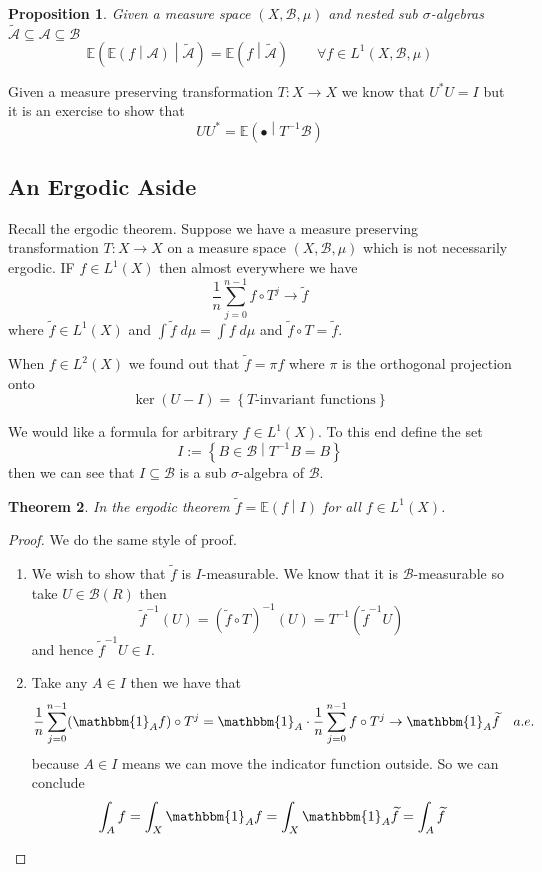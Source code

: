\documentclass[11pt]{article}
\newcommand{\defeq}{:=}
\newcommand{\indic}[1]{\mathbbm{1}_{#1}}
\newcommand{\relmiddle}[1]{\mathrel{}\middle#1\mathrel{}}
\newcommand{\rmv}{\relmiddle|}
\newcommand{\gvn}[2]{\ensuremath{\left(#1\rmv#2\right)}}
\newcommand{\expg}[2]{\ensuremath{\mathbb{E}\gvn{#1}{#2}}}
\newcommand{\dm}{\;d\mu}
\newtheorem{prop}{Proposition}[section]
\newtheorem{theorem}[prop]{Theorem}
\begin{document}
\begin{prop}
Given a measure space $(X, \mathcal{B}, \mu)$ and nested sub $\sigma$-algebras $\widetilde{\mathcal{A}}\subseteq\mathcal{A}\subseteq\mathcal{B}$
\[
	\expg{\expg{f}{\mathcal{A}}}{\widetilde{\mathcal{A}}} = \expg{f}{\widetilde{\mathcal{A}}} \quad \quad \forall f \in L^1(X, \mathcal{B}, \mu)
\]
\end{prop}

Given a measure preserving transformation $T: X \to X$ we know that $U^\ast U = I$ but it is an exercise to show that
\[
	UU^\ast = \expg{\bullet}{T^{-1}\mathcal{B}}
\]



\subsection{An Ergodic Aside}
Recall the ergodic theorem.
Suppose we have a measure preserving transformation $T:X \to X$ on a measure space $(X, \mathcal{B}, \mu)$ which is not necessarily ergodic.
IF $f\in L^1(X)$ then almost everywhere we have
\[
	\frac{1}{n}\sum_{j=0}^{n-1}f\circ T^j \to \widetilde{f}
\]
where $\widetilde{f}\in L^1(X)$ and $\int \widetilde{f}\dm = \int f \dm$ and $\widetilde{f}\circ T = \widetilde{f}$.

When $f\in L^2(X)$ we found out that $\widetilde{f}=\pi f$ where $\pi$ is the orthogonal projection onto
\[
\ker(U - I) = \left\{ T\text{-invariant functions} \right\}
\]

We would like a formula for arbitrary $f\in L^1(X)$.
To this end define the set
\[
	I \defeq \left\{ B\in \mathcal{B} \rmv T^{-1}B = B\right\}
\]
then we can see that $I\subseteq\mathcal{B}$ is a sub $\sigma$-algebra of $\mathcal{B}$.

\begin{theorem}
In the ergodic theorem $\widetilde{f}= \expg{f}{I}$ for all $f\in L^1(X)$.
\end{theorem}

\begin{proof}
We do the same style of proof.
\begin{enumerate}[label=(\roman*)]
	\item We wish to show that $\widetilde{f}$ is $I$-measurable.
		We know that it is $\mathcal{B}$-measurable so take $U\in\mathcal{B}(R)$ then
		\[
			\widetilde{f}^{-1}(U) = (\widetilde{f}\circ T)^{-1}(U) = T^{-1}(\widetilde{f}^{-1}U)
		\]
		and hence $\widetilde{f}^{-1}U\in I$.
	\item Take any $A\in I$ then we have that
		\[
			\frac{1}{n}\sum_{j=0}^{n-1}(\indic{A} f ) \circ T^j = \indic{A} \cdot \frac{1}{n}\sum_{j=0}^{n-1}f \circ T^j \to \indic{A} \widetilde{f}\quad a.e.
		\]
		because $A\in I$ means we can move the indicator function outside.
		So we can conclude
		\[
			\int_A f = \int_X \indic{A} f = \int_X \indic{A}\widetilde{f} = \int_A \widetilde{f}
		\]
\end{enumerate}
\end{proof}
\end{document}
